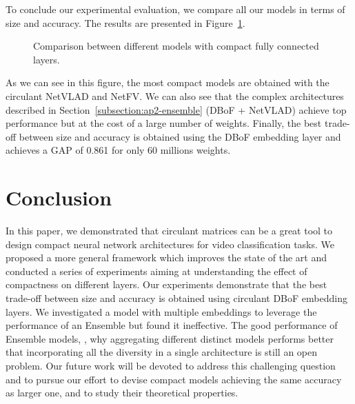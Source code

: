 To conclude our experimental evaluation, we compare all our models in terms of size and accuracy.
The results are presented in Figure~\ref{figure:ap2-models}. 

\begin{figure}[htb]
  \centering
  
  \caption{Comparison between different models with compact fully connected layers.}
  \label{figure:ap2-models}
\end{figure}

As we can see in this figure, the most compact models are obtained with the circulant NetVLAD and NetFV.
We can also see that the complex architectures described in Section~\ref{subsection:ap2-ensemble} (DBoF + NetVLAD) achieve top performance but at the cost of a large number of weights.
Finally, the best trade-off between size and accuracy is obtained using the DBoF embedding layer and achieves a GAP of 0.861 for only 60 millions weights.


\section{Conclusion}

In this paper, we demonstrated that circulant matrices can be a great tool to design compact neural network architectures for video classification tasks.
We proposed a more general framework which improves the state of the art and conducted a series of experiments aiming at understanding the effect of compactness on different layers.
Our experiments demonstrate that the best trade-off between size and accuracy is obtained using circulant DBoF embedding layers.
We investigated a model with multiple embeddings to leverage the performance of an Ensemble but found it ineffective.
The good performance of Ensemble models, \ie, why aggregating different distinct models performs better that incorporating all the diversity in a single architecture is still an open problem.
Our future work will be devoted to address this challenging question and to pursue our effort to devise compact models achieving the same accuracy as larger one, and to study their theoretical properties.
